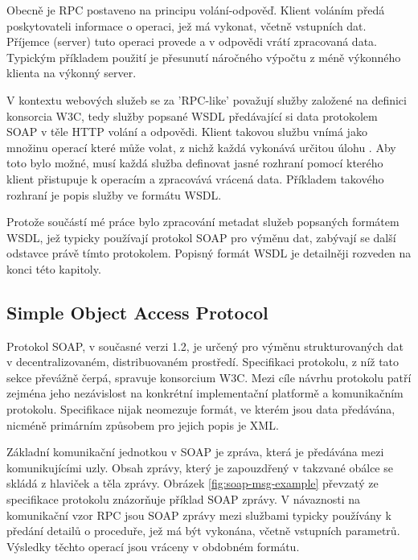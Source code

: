 \documentclass[czech,DP]{thesiskiv}
\begin{document}
Obecně je RPC postaveno na principu volání-odpověď. Klient voláním předá poskytovateli informace o operaci, jež má vykonat, včetně vstupních dat. Příjemce (server) tuto operaci provede a v odpovědi vrátí zpracovaná data. Typickým příkladem použití je přesunutí náročného výpočtu z méně výkonného klienta na výkonný server.

V kontextu webových služeb se za 'RPC-like' považují služby založené na definici konsorcia W3C, tedy služby popsané WSDL předávající si data protokolem SOAP v těle HTTP volání a odpovědi. Klient takovou službu vnímá jako množinu operací které může volat, z nichž každá vykonává určitou úlohu \cite{rpcVsRest}. Aby toto bylo možné, musí každá služba definovat jasné rozhraní pomocí kterého klient přistupuje k operacím a zpracovává vrácená data. Příkladem takového rozhraní je popis služby ve formátu WSDL. 

Protože součástí mé práce bylo zpracování metadat služeb popsaných formátem WSDL, jež typicky používají protokol SOAP pro výměnu dat, zabývají se další odstavce právě tímto protokolem. Popisný formát WSDL je detailněji rozveden na konci této kapitoly.

\subsection{Simple Object Access Protocol} 


Protokol SOAP, v současné verzi 1.2, je určený pro výměnu strukturovaných dat v decentralizovaném, distribuovaném prostředí. Specifikaci protokolu\cite{soap12}, z níž tato sekce převážně čerpá, spravuje konsorcium W3C. Mezi cíle návrhu protokolu patří zejména jeho nezávislost na konkrétní implementační platformě a komunikačním protokolu\cite{soap12}. Specifikace nijak neomezuje formát, ve kterém jsou data předávána, nicméně primárním způsobem pro jejich popis je XML.

Základní komunikační jednotkou v SOAP je zpráva, která je předávána mezi komunikujícími uzly. Obsah zprávy, který je zapouzdřený v takzvané obálce se skládá z hlaviček a těla zprávy. Obrázek \ref{fig:soap-msg-example} převzatý ze specifikace protokolu znázorňuje příklad SOAP zprávy. V návaznosti na komunikační vzor RPC jsou SOAP zprávy mezi službami typicky používány k předání detailů o proceduře, jež má být vykonána, včetně vstupních parametrů. Výsledky těchto operací jsou vráceny v obdobném formátu.
\end{document}
